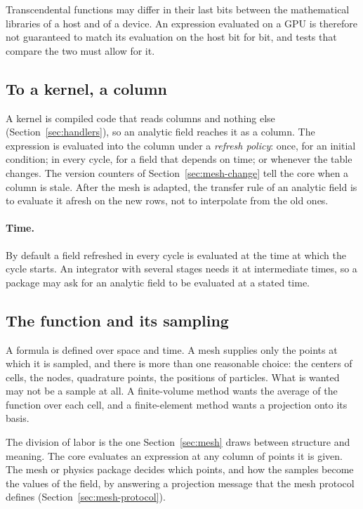 \documentclass[11pt,a4paper]{article}
\begin{document}
Transcendental functions may differ in their last bits between the
mathematical libraries of a host and of a device.  An expression evaluated
on a GPU is therefore not guaranteed to match its evaluation on the host
bit for bit, and tests that compare the two must allow for it.

\subsection{To a kernel, a column}

A kernel is compiled code that reads columns and nothing else
(Section~\ref{sec:handlers}), so an analytic field reaches it as a column.  The
expression is evaluated into the column under a \emph{refresh policy}:
once, for an initial condition; in every cycle, for a field that depends on
time; or whenever the table changes.  The version counters of
Section~\ref{sec:mesh-change} tell the core when a column is stale.  After
the mesh is adapted, the transfer rule of an analytic field is to evaluate
it afresh on the new rows, not to interpolate from the old ones.

\paragraph{Time.}  By default a field refreshed in every cycle is evaluated
at the time at which the cycle starts.  An integrator with several stages
needs it at intermediate times, so a package may ask for an analytic field
to be evaluated at a stated time.

\subsection{The function and its sampling}

A formula is defined over space and time.  A mesh supplies only the points
at which it is sampled, and there is more than one reasonable choice: the
centers of cells, the nodes, quadrature points, the positions of particles.
What is wanted may not be a sample at all.  A finite-volume method wants
the average of the function over each cell, and a finite-element method
wants a projection onto its basis.

The division of labor is the one Section~\ref{sec:mesh} draws between
structure and meaning.  The core evaluates an expression at any column of
points it is given.  The mesh or physics package decides which points, and
how the samples become the values of the field, by answering a projection
message that the mesh protocol defines (Section~\ref{sec:mesh-protocol}).
\end{document}
